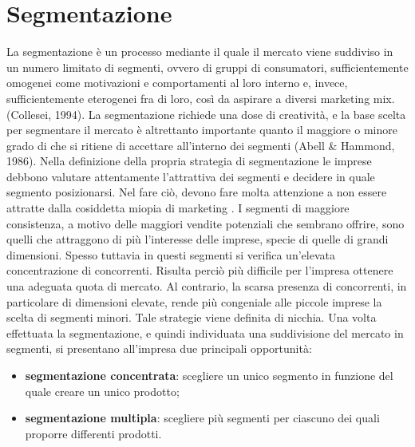 \section{Segmentazione}
La segmentazione è un processo mediante il quale il mercato viene suddiviso in un numero limitato di segmenti, ovvero di gruppi di consumatori, sufficientemente omogenei come motivazioni e comportamenti al loro interno e, invece, sufficientemente eterogenei fra di loro, così da aspirare a diversi marketing mix.(Collesei, 1994). \newline
La segmentazione richiede una dose di creatività, e la base scelta per segmentare il mercato è altrettanto importante quanto il maggiore o minore grado di che si ritiene di accettare all’interno dei segmenti (Abell \& Hammond, 1986). \newline
Nella definizione della propria strategia di segmentazione le imprese debbono valutare attentamente l’attrattiva dei segmenti e decidere in quale segmento posizionarsi. Nel fare ciò, devono fare molta attenzione a non essere attratte dalla cosiddetta miopia di marketing . I segmenti di maggiore consistenza, a motivo delle maggiori vendite potenziali che sembrano offrire, sono quelli che attraggono di più l’interesse delle imprese, specie di quelle di grandi dimensioni. Spesso tuttavia in questi segmenti si verifica un’elevata concentrazione di concorrenti. Risulta perciò più difficile per l’impresa ottenere una adeguata quota di mercato. Al contrario, la scarsa presenza di concorrenti, in particolare di dimensioni elevate, rende più congeniale alle piccole imprese la scelta di segmenti minori. Tale strategie viene definita di nicchia. \newline
Una volta effettuata la segmentazione, e quindi individuata una suddivisione del mercato in segmenti, si presentano all’impresa due principali opportunità:
\begin{itemize}
	\item \textbf{segmentazione concentrata}: scegliere un unico segmento in funzione del quale creare un unico prodotto;
	\item \textbf{segmentazione multipla}: scegliere più segmenti per ciascuno dei quali proporre differenti prodotti.
\end{itemize}


